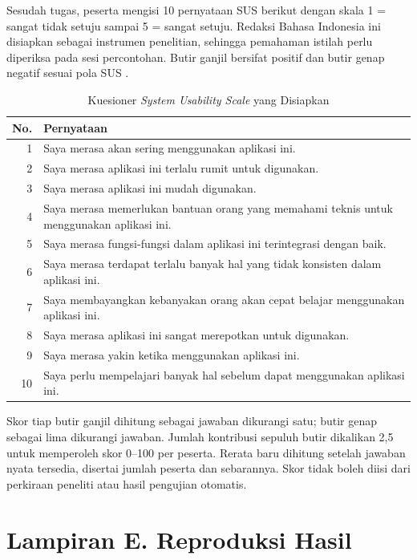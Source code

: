 Sesudah tugas, peserta mengisi 10 pernyataan SUS berikut dengan skala 1 = sangat tidak setuju sampai 5 = sangat setuju. Redaksi Bahasa Indonesia ini disiapkan sebagai instrumen penelitian, sehingga pemahaman istilah perlu diperiksa pada sesi percontohan. Butir ganjil bersifat positif dan butir genap negatif sesuai pola SUS \citep*{brooke1996sus}.

\begin{table}[H]
\centering
\caption{Kuesioner \textit{System Usability Scale} yang Disiapkan}
\label{tab:lampiran-sus}
\begin{tabular}{r>{\RaggedRight\arraybackslash}p{}}
\toprule
No. & Pernyataan \\
\midrule
1 & Saya merasa akan sering menggunakan aplikasi ini. \\
2 & Saya merasa aplikasi ini terlalu rumit untuk digunakan. \\
3 & Saya merasa aplikasi ini mudah digunakan. \\
4 & Saya merasa memerlukan bantuan orang yang memahami teknis untuk menggunakan aplikasi ini. \\
5 & Saya merasa fungsi-fungsi dalam aplikasi ini terintegrasi dengan baik. \\
6 & Saya merasa terdapat terlalu banyak hal yang tidak konsisten dalam aplikasi ini. \\
7 & Saya membayangkan kebanyakan orang akan cepat belajar menggunakan aplikasi ini. \\
8 & Saya merasa aplikasi ini sangat merepotkan untuk digunakan. \\
9 & Saya merasa yakin ketika menggunakan aplikasi ini. \\
10 & Saya perlu mempelajari banyak hal sebelum dapat menggunakan aplikasi ini. \\
\bottomrule
\end{tabular}
\end{table}

Skor tiap butir ganjil dihitung sebagai jawaban dikurangi satu; butir genap sebagai lima dikurangi jawaban. Jumlah kontribusi sepuluh butir dikalikan 2,5 untuk memperoleh skor 0--100 per peserta. Rerata baru dihitung setelah jawaban nyata tersedia, disertai jumlah peserta dan sebarannya. Skor tidak boleh diisi dari perkiraan peneliti atau hasil pengujian otomatis.

\section*{Lampiran E. Reproduksi Hasil}
{}

